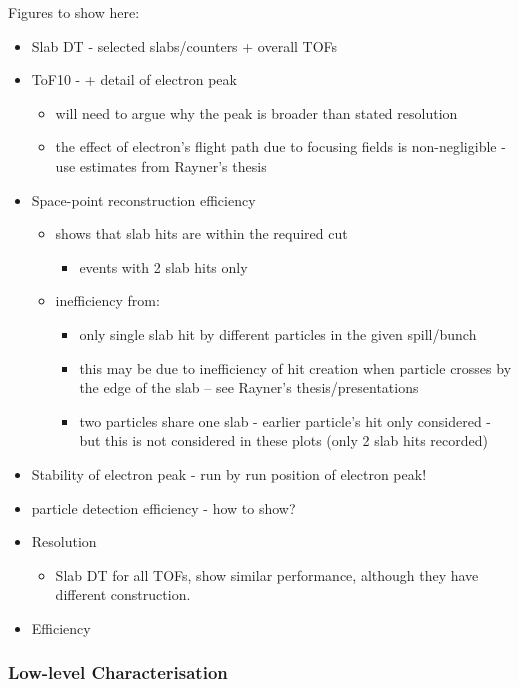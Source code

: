 Figures to show here:
\begin{itemize}
\item Slab DT - selected slabs/counters + overall TOFs
\item ToF10 - + detail of electron peak
  \begin{itemize} \it
  \item will need to argue why the peak is broader than stated
    resolution
  \item the effect of electron's flight path due to focusing fields is
    non-negligible - use estimates from Rayner's thesis
  \end{itemize}
\item Space-point reconstruction efficiency
  \begin{itemize}
  \item shows that slab hits are within the required cut
    \begin{itemize}
    \item events with 2 slab hits only
    \end{itemize}
  \item inefficiency from:
    \begin{itemize}
    \item only single slab hit by different particles in the given
      spill/bunch
    \item this may be due to inefficiency of hit creation when
      particle crosses by the edge of the slab -- see Rayner's
      thesis/presentations
    \item two particles share one slab - earlier particle's hit only
      considered - but this is not considered in these plots (only 2
      slab hits recorded)
    \end{itemize}
  \end{itemize}
\item Stability of electron peak - run by run position of electron peak!
\item particle detection efficiency - how to show?
\item Resolution
  \begin{itemize}
  \item Slab DT for all TOFs, show similar performance, although
    they have different construction.
  \end{itemize}
\item {}Efficiency
\end{itemize}


\subsubsection{Low-level Characterisation}

